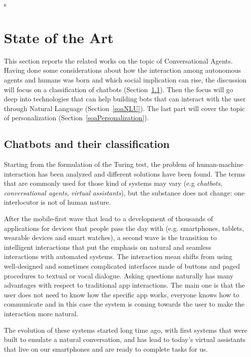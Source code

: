 s%

\chapter{State of the Art}
\label{soa}

This section reports the related works on the topic of Conversational Agents. Having done some considerations about how the interaction among autonomous agents and humans was born and which social implication can rise, the discussion will focus on a classification of chatbots (Section~\ref{soaClassification}). Then the focus will go deep into technologies that can help building bots that can interact with the user through Natural Language (Section~\ref{soaNLU}). The last part will cover the topic of personalization (Section~\ref{soaPersonalization}).

\section{Chatbots and their classification}
\label{soaClassification}

Starting from the formulation of the Turing test, the problem of human-machine interaction has been analyzed and different solutions have been found. The terms that are commonly used for those kind of systems may vary (e.g \textit{chatbots}, \textit{conversational agents}, \textit{virtual assistants}), but the substance does not change: one interlocutor is not of human nature.

After the mobile-first wave that lead to a development of thousands of applications for devices that people pass the day with (e.g. smartphones, tablets, wearable devices and smart watches), a second wave is the transition to intelligent interactions that put the emphasis on natural and seamless interactions with automated systems. The interaction mean shifts from using well-designed and sometimes complicated interfaces made of buttons and paged procedures to textual or vocal dialogue. Asking questions naturally has many advantages with respect to traditional app interactions. The main one is that the user does not need to know how the specific app works, everyone knows how to communicate and in this case the system is coming towards the user to make the interaction more natural.

The evolution of these systems started long time ago, with first systems that were built to emulate a natural conversation, and has lead to today's virtual assistants that live on our smartphones and are ready to complete tasks for us.

